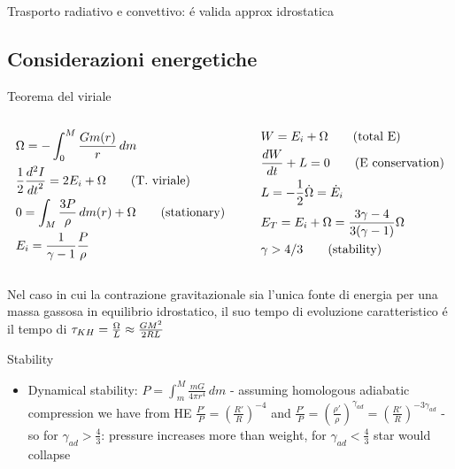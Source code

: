 \begin{frame}{Trasporto radiativo e convettivo: \'e valida approx idrostatica}

\end{frame}

\subsection{Considerazioni energetiche}

\begin{frame}{Teorema del viriale}
\begin{columns}[T]
	\begin{column}{0.45\textwidth}
		\begin{align*}
&\Omega=-\int_0^M\frac{Gm(r)}{r}\,dm\\
&\frac{1}{2}\TtwoDy{t}{I}=2E_i+\Omega\tag{T. viriale}\\
&0=\int_M\frac{3P}{\rho}\,dm(r)+\Omega\tag{stationary}\\
&E_i=\frac{1}{\gamma-1}\frac{P}{\rho}
		\end{align*}
	\end{column}\begin{column}{0.55\textwidth}
		\begin{align*}
&W=E_i+\Omega \tag{total E}\\
&\TDy{t}{W}+L=0\tag{E conservation}\\
&L=-\frac{1}{2}\dot{\Omega}=\dot{E}_i\\
&E_T=E_i+\Omega=\frac{3\gamma-4}{3(\gamma-1)}\Omega\\
&\gamma>4/3\tag{stability}
		\end{align*}
	\end{column}
\end{columns}
Nel caso in cui la contrazione gravitazionale sia l'unica fonte di energia per una massa gassosa in equilibrio idrostatico, il suo tempo di evoluzione caratteristico \'e il tempo di \kh{} $\tkh{}=\frac{\Omega}{L}\approx\frac{GM^2}{2RL}$
\end{frame}

\frameinlbftrue
\begin{frame}{Stability}

	\begin{itemize}
		\item 
			Dynamical stability: $P=\int_m^M\frac{mG}{4\pi r^4}\,dm$ - assuming homologous adiabatic compression we have from HE $\frac{P'}{P}=(\frac{R'}{R})^{-4}$ and $\frac{P'}{P}=(\frac{\rho'}{\rho})^{\gamma_{ad}}=(\frac{R'}{R})^{-3\gamma_{ad}}$ - so for $\gamma_{ad}>\frac{4}{3}$: pressure increases more than weight, for $\gamma_{ad}<\frac{4}{3}$ star would collapse
		\end{itemize}
	
\end{frame}
\frameinlbffalse

